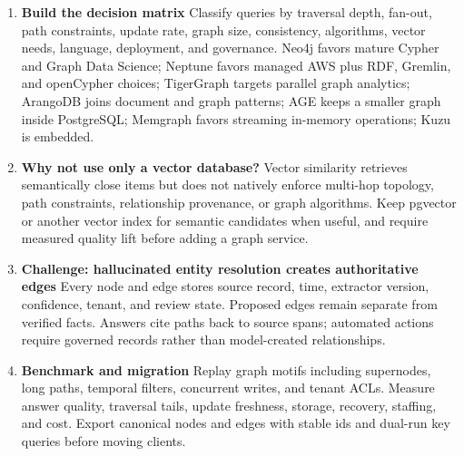 \begin{enumerate}
\item \textbf{Build the decision matrix} Classify queries by traversal depth, fan-out, path constraints, update rate, graph size, consistency, algorithms, vector needs, language, deployment, and governance. Neo4j favors mature Cypher and Graph Data Science; Neptune favors managed AWS plus RDF, Gremlin, and openCypher choices; TigerGraph targets parallel graph analytics; ArangoDB joins document and graph patterns; AGE keeps a smaller graph inside PostgreSQL; Memgraph favors streaming in-memory operations; Kuzu is embedded.
\item \textbf{Why not use only a vector database?} Vector similarity retrieves semantically close items but does not natively enforce multi-hop topology, path constraints, relationship provenance, or graph algorithms. Keep pgvector or another vector index for semantic candidates when useful, and require measured quality lift before adding a graph service.
\item \textbf{Challenge: hallucinated entity resolution creates authoritative edges} Every node and edge stores source record, time, extractor version, confidence, tenant, and review state. Proposed edges remain separate from verified facts. Answers cite paths back to source spans; automated actions require governed records rather than model-created relationships.
\item \textbf{Benchmark and migration} Replay graph motifs including supernodes, long paths, temporal filters, concurrent writes, and tenant ACLs. Measure answer quality, traversal tails, update freshness, storage, recovery, staffing, and cost. Export canonical nodes and edges with stable ids and dual-run key queries before moving clients.
\end{enumerate}
